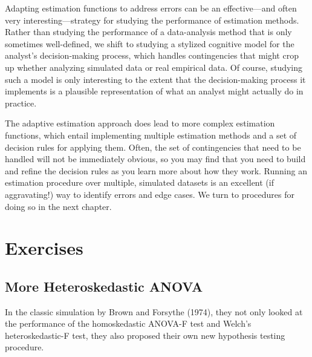 \documentclass[
]{book}
\begin{document}
Adapting estimation functions to address errors can be an effective---and often very interesting---strategy for studying the performance of estimation methods.
Rather than studying the performance of a data-analysis method that is only sometimes well-defined, we shift to studying a stylized cognitive model for the analyst's decision-making process, which handles contingencies that might crop up whether analyzing simulated data or real empirical data.
Of course, studying such a model is only interesting to the extent that the decision-making process it implements is a plausible representation of what an analyst might actually do in practice.

The adaptive estimation approach does lead to more complex estimation functions, which entail implementing multiple estimation methods and a set of decision rules for applying them.
Often, the set of contingencies that need to be handled will not be immediately obvious, so you may find that you need to build and refine the decision rules as you learn more about how they work.
Running an estimation procedure over multiple, simulated datasets is an excellent (if aggravating!) way to identify errors and edge cases.
We turn to procedures for doing so in the next chapter.

\section{Exercises}\label{exercises-4}

\subsection{More Heteroskedastic ANOVA}\label{BFFs-forever}

In the classic simulation by Brown and Forsythe (1974), they not only looked at the performance of the homoskedastic ANOVA-F test and Welch's heteroskedastic-F test, they also proposed their own new hypothesis testing procedure.
\end{document}
